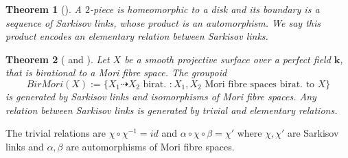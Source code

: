 \documentclass[12pt, oneside, reqno]{amsart}
\newtheorem{theorem}{Theorem}[section]
\begin{document}
\begin{theorem}[\cite{Lamy_2020}] \label{ElementaryRelation}
    A $2$-piece is homeomorphic to a disk and its boundary is a sequence of Sarkisov links, whose product is an automorphism. We say this product encodes an elementary relation between Sarkisov links.
\end{theorem}
\begin{theorem}[\cite{Iskovskikh} and \cite{Lamy_2020}] \label{Isk}
    Let $X$ be a smooth projective surface over a perfect field $\textbf{k}$, that is birational to a Mori fibre space. The groupoid 
    \[BirMori(X) := \{X_1 \dashrightarrow X_2 \text{ birat. } : X_1,X_2 \text{ Mori fibre spaces birat. to } X\} \]
    is generated by Sarkisov links and isomorphisms of Mori fibre spaces. Any relation between Sarkisov links is generated by trivial and elementary relations.
\end{theorem}
\noindent
The trivial relations are $\chi \circ \chi^{-1} = id$ and $\alpha \circ \chi \circ \beta = \chi'$ where $\chi, \chi'$ are Sarkisov links and $\alpha, \beta $ are automorphisms of Mori fibre spaces.
\end{document}
